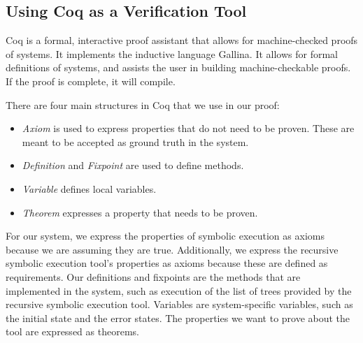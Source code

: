\subsection{Using Coq as a Verification Tool}
Coq is a formal, interactive proof assistant that allows for machine-checked proofs of systems. 
It implements the inductive language Gallina. It allows for formal definitions of systems, and assists the user in building machine-checkable proofs. If the proof is complete, it will compile.

There are four main structures in Coq that we use in our proof:
\begin{itemize}
\item \emph{Axiom} is used to express properties that do not need to be proven. These are meant to be accepted as ground truth in the system. 
\item \emph{Definition} and \emph{Fixpoint} are used to define methods.
\item \emph{Variable} defines local variables.
\item \emph{Theorem} expresses a property that needs to be proven.

\end{itemize}

For our system, we express the properties of symbolic execution as axioms because we are assuming they are true. Additionally, we express the recursive symbolic execution tool's properties as axioms because these are defined as requirements. Our definitions and fixpoints are the methods that are implemented in the system, such as execution of the list of trees provided by the recursive symbolic execution tool. Variables are system-specific variables, such as the initial state and the error states. The properties we want to prove about the tool are expressed as theorems.





